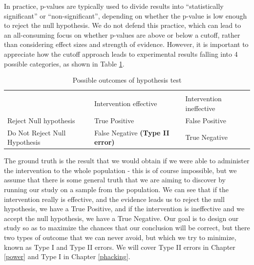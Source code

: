 \documentclass{krantz}
\begin{document}
In practice, p-values are typically used to divide results into ``statistically significant'' or ``non-significant'', depending on whether the p-value is low enough to reject the null hypothesis. We do not defend this practice, which can lead to an all-consuming focus on whether p-values are above or below a cutoff, rather than considering effect sizes and strength of evidence. However, it is important to appreciate how the cutoff approach leads to experimental results falling into 4 possible categories, as shown in Table \ref{tab:confusionMat}.

\begin{table}

\caption{\label{tab:confusionMat}Possible outcomes of hypothesis test}
\centering
\begin{tabular}[t]{>{\centering\arraybackslash}p{9em}>{\centering\arraybackslash}p{9em}>{\centering\arraybackslash}p{9em}}
\toprule
\multicolumn{1}{c}{ } & \multicolumn{2}{c}{Ground truth} \\
\cmidrule(l{3pt}r{3pt}){2-3}
 & Intervention effective & Intervention ineffective\\
\midrule
Reject Null hypothesis & True Positive & False Positive 
\textbf{\cellcolor{gray!6}{ (Type I error)}}\\
\addlinespace
Do Not Reject Null Hypothesis & False Negative 
\textbf{ (Type II error)} & True Negative\\
\bottomrule
\end{tabular}
\end{table}

The ground truth is the result that we would obtain if we were able to administer the intervention to the whole population - this is of course impossible, but we assume that there is some general truth that we are aiming to discover by running our study on a sample from the population. We can see that if the intervention really is effective, and the evidence leads us to reject the null hypothesis, we have a True Positive, and if the intervention is ineffective and we accept the null hypothesis, we have a True Negative. Our goal is to design our study so as to maximize the chances that our conclusion will be correct, but there two types of outcome that we can never avoid, but which we try to minimize, known as Type I and Type II errors. We will cover Type II errors in Chapter \ref{power} and Type I in Chapter \ref{phacking}.
\end{document}

